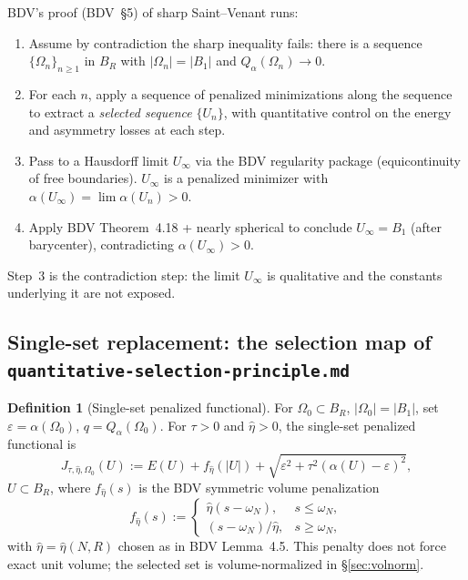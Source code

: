 \documentclass[11pt]{amsart}
\theoremstyle{definition}
\newtheorem{definition}[theorem]{Definition}
\newcommand{\abs}[1]{\left|#1\right|}
\begin{document}
BDV's proof (BDV~\S 5) of sharp Saint--Venant runs:
\begin{enumerate}
\item Assume by contradiction the sharp inequality fails: there is a
sequence $\{\Omega_n\}_{n\ge1}$ in $B_R$ with $\abs{\Omega_n}=\abs{B_1}$ and
\(Q_\alpha(\Omega_n)\to 0\).
\item For each $n$, apply a sequence of penalized minimizations along the
sequence to extract a \emph{selected sequence} $\{U_n\}$, with quantitative
control on the energy and asymmetry losses at each step.
\item Pass to a Hausdorff limit $U_\infty$ via the BDV regularity package
(equicontinuity of free boundaries). $U_\infty$ is a penalized minimizer
with $\alpha(U_\infty)=\lim\alpha(U_n)>0$.
\item Apply BDV Theorem~4.18 + nearly spherical to conclude $U_\infty=B_1$
(after barycenter), contradicting $\alpha(U_\infty)>0$.
\end{enumerate}

Step~3 is the contradiction step: the limit $U_\infty$ is qualitative and
the constants underlying it are not exposed.

\subsection{Single-set replacement: the selection map of
\texttt{quantitative-selection-principle.md}}

\begin{definition}[Single-set penalized functional]\label{def:penal}
For $\Omega_0\subset B_R$, $\abs{\Omega_0}=\abs{B_1}$, set
$\varepsilon=\alpha(\Omega_0)$, $q=Q_\alpha(\Omega_0)$. For
$\tau>0$ and $\hat\eta>0$, the single-set penalized functional is
\[
J_{\tau,\hat\eta,\Omega_0}(U)
:=E(U)+f_{\hat\eta}(\abs U)
+\sqrt{\varepsilon^2+\tau^2(\alpha(U)-\varepsilon)^2},
\]
$U\subset B_R$, where $f_{\hat\eta}(s)$ is the BDV symmetric volume
penalization
\[
f_{\hat\eta}(s):=
\begin{cases}
\hat\eta(s-\omega_N),&s\le\omega_N,\\
(s-\omega_N)/\hat\eta,&s\ge\omega_N,
\end{cases}
\]
with $\hat\eta=\hat\eta(N,R)$ chosen as in BDV Lemma~4.5. This penalty does
not force exact unit volume; the selected set is volume-normalized in
\S\ref{sec:volnorm}.
\end{definition}
\end{document}
